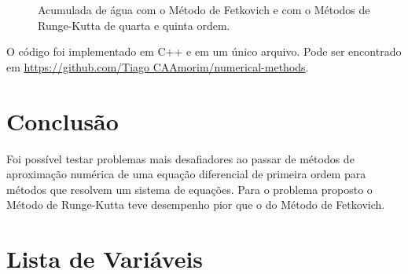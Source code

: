 \documentclass[final,5p]{elsarticle}
\numberwithin{equation}{section}
\begin{document}
        \begin{figure}[hbt!]
            \caption{Acumulada de água com o Método de Fetkovich e com o Métodos de Runge-Kutta de quarta e quinta ordem.}
            \label{fig:weestimado}
        \end{figure}

        O código foi implementado em C++ e em um único arquivo. Pode ser encontrado em \href{https://github.com/TiagoCAAmorim/numerical-methods/blob/main/09_RungeKuttaSystem/09_RungeKuttaSystem.cpp}{https://github.com/Tiago CAAmorim/numerical-methods}.

    \section{Conclusão}

        Foi possível testar problemas mais desafiadores ao passar de métodos de aproximação numérica de uma equação diferencial de primeira ordem para métodos que resolvem um sistema de equações. Para o problema proposto o Método de Runge-Kutta teve desempenho pior que o do Método de Fetkovich.



\appendix

\section{Lista de Variáveis}
\end{document}
